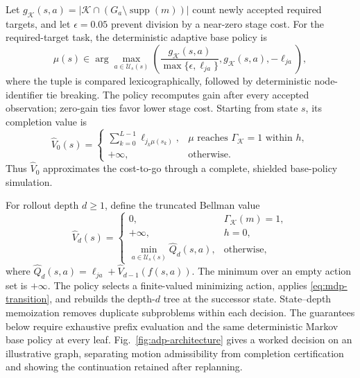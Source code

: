\documentclass{IEEEtaes}
\theoremstyle{remark}
\theoremstyle{plain}
\begin{document}
Let $g_{\mathcal K}(s,a)=|\mathcal K\cap(G_a\setminus\operatorname{supp}(m))|$ count newly accepted required targets, and let $\epsilon=0.05$ prevent division by a near-zero stage cost. For the required-target task, the deterministic adaptive base policy is
\begin{equation}
  \mu(s)\in\arg\max_{a\in\mathcal U_s(s)}
  \left(\frac{g_{\mathcal K}(s,a)}{\max\{\epsilon,\ell_{ja}\}},
  g_{\mathcal K}(s,a),-\ell_{ja}\right),
  \label{eq:base-policy}
\end{equation}
where the tuple is compared lexicographically, followed by deterministic node-identifier tie breaking. The policy recomputes gain after every accepted observation; zero-gain ties favor lower stage cost. Starting from state $s$, its completion value is
\begin{equation}
  \widehat V_0(s)=
  \begin{cases}
  \sum_{k=0}^{L-1}\ell_{j_k\mu(s_k)}, & \mu\text{ reaches }\Gamma_{\mathcal K}=1\text{ within }h,\\
  +\infty, & \text{otherwise}.
  \end{cases}
  \label{eq:base-value}
\end{equation}
Thus $\widehat V_0$ approximates the cost-to-go through a complete, shielded base-policy simulation.

For rollout depth $d\ge1$, define the truncated Bellman value
\begin{equation}
  \widehat V_d(s)=
  \begin{cases}
    0, & \Gamma_{\mathcal K}(m)=1,\\
    +\infty, & h=0,\\
    \min\limits_{a\in\mathcal U_s(s)}\widehat Q_d(s,a), & \text{otherwise},
  \end{cases}
  \label{eq:rollout-value}
\end{equation}
where $\widehat Q_d(s,a)=\ell_{ja}+\widehat V_{d-1}(f(s,a))$.
The minimum over an empty action set is $+\infty$. The policy selects a finite-valued minimizing action, applies \eqref{eq:mdp-transition}, and rebuilds the depth-$d$ tree at the successor state. State--depth memoization removes duplicate subproblems within each decision. The guarantees below require exhaustive prefix evaluation and the same deterministic Markov base policy at every leaf.
Fig.~\ref{fig:adp-architecture} gives a worked decision on an illustrative graph, separating motion admissibility from completion certification and showing the continuation retained after replanning.
\end{document}

